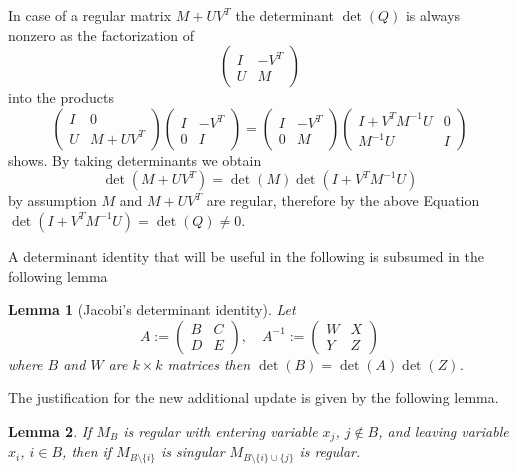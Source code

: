 \documentclass[a4paper]{article}
\newtheorem{lemma}{Lemma}
\begin{document}
In case of a regular matrix $M+UV^{T}$ the determinant $\det(Q)$ is
always nonzero as the factorization of 
\begin{equation*}
\left(
\begin{array}{cc}
I & -V^{T} \\
U & M
\end{array}
\right)
\end{equation*}
into the products 
\begin{equation*}
\left(
\begin{array}{cc}
I & 0 \\
U & M + UV^{T}
\end{array}
\right)
\left(
\begin{array}{cc}
I & -V^{T} \\
0 & I
\end{array}
\right)
=
\left(
\begin{array}{cc}
I & -V^{T}  \\
0 & M
\end{array}
\right)
\left(
\begin{array}{cc}
I + V^{T}M^{-1}U & 0 \\
M^{-1}U          & I
\end{array}
\right)
\end{equation*}
shows.
By taking determinants we obtain
\begin{equation}
\label{eq:det_prod}
\det\left(M + UV^{T}\right) =
\det\left(M\right) \det\left(I + V^{T}M^{-1}U\right)
\end{equation}
by assumption $M$ and $M+UV^{T}$ are regular, therefore by the above
Equation
$\det(I + V^{T}M^{-1}U)=\det(Q) \neq 0$.

A determinant identity that will be useful in the following is subsumed in the
following lemma
\begin{lemma}[Jacobi's determinant identity]
\label{lem:Jacobi_det_id}
Let
\begin{equation}
A:=
\left(
\begin{array}{c|c}
B & C \\
\hline
D & E
\end{array}
\right)
, \quad
A^{-1}:=
\left(
\begin{array}{c|c}
W & X \\
\hline
Y & Z
\end{array}
\right)
\end{equation}
where $B$ and $W$ are $k \times k$ matrices then $\det(B)=\det(A)\det(Z)$.
\end{lemma}
The justification for the new additional update is given by the following
lemma.
\begin{lemma}
\label{lem:main}
If $M_{B}$ is regular with entering variable $x_{j}$, $j \not \in B$, and
leaving variable $x_{i}$, $i \in B$, then if $M_{B \setminus \{i\}}$ 
is singular $M_{B \setminus \{i\} \cup \{j\}}$ is regular.
\end{lemma}
\end{document}
